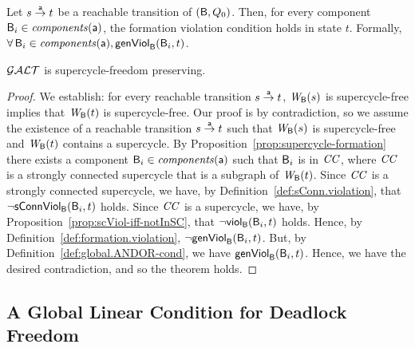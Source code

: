 \begin{definition} \label{def:global.ANDOR-cond} \label{defn:global.ANDOR-cond} 
Let $s \goesto[\act] t$ be a reachable transition of $(\B, Q_0)$.
Then, for every component $\B_i \in \comps{\act}$, the formation violation condition holds in state $t$.
Formally,\\
\ind  $\fas \B_i \in \comps{\act}, \genViol{\B_i}{t}$.
\end{definition}


\begin{theorem} \label{thm:GAO.SC-free-preserving}
$\GAO$ is supercycle-freedom preserving.
\end{theorem}
%
\begin{proof}
We establish:
for every reachable transition $s \la{\act} t$,
$\wfg{\B}{s}$ is supercycle-free implies that $\wfg{\B}{t}$ is
supercycle-free. Our proof is by contradiction, so we assume the existence of a reachable transition
$s \la{\act} t$ such that $\wfg{\B}{s}$ is supercycle-free and $\wfg{\B}{t}$ contains a supercycle.
%
By Proposition~\ref{prop:supercycle-formation}
 there exists a component $\B_i \in \cmps{\act}$ such that $\B_i$ is in $\CC$, where 
$\CC$ is a strongly connected supercycle that is a subgraph of $\wfg{\B}{t}$.
%
Since $\CC$ is a strongly connected supercycle, we have,
 by Definition~\ref{def:sConn.violation}, that $\neg \connViol{\B_i}{t}$ holds.
%
Since $\CC$ is a supercycle, we have, by Proposition~\ref{prop:scViol-iff-notInSC}, 
that $\neg \scV{\B_i}{t}$ holds. %
%
Hence, by Definition~\ref{def:formation.violation}, $\neg \formViol{\B_i}{t}$.
But, by Definition~\ref{def:global.ANDOR-cond}, we have $\formViol{\B_i}{t}$.
Hence, we have the desired contradiction, and so the theorem holds.
\end{proof}









   \subsection{A Global Linear Condition for Deadlock Freedom}
   \label{s:globCondition}
   \label{s:global.Linear}
%   

